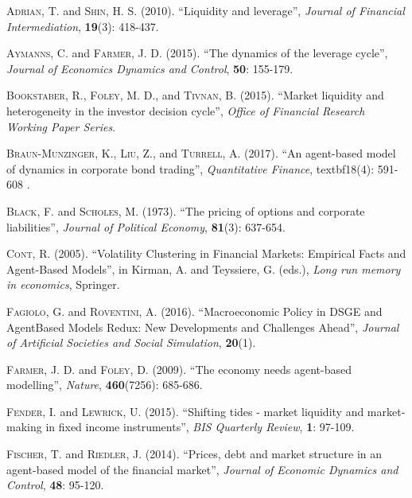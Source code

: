 \documentclass[11pt]{article}
\begin{document}
\begin{thebibliography}{100}{}
	 \textsc{Adrian, T.} and \textsc{Shin, H. S.} (2010). ``Liquidity and leverage'', \emph{Journal of Financial Intermediation}, \textbf{19}(3): 418-437.

	 \textsc{Aymanns, C.} and \textsc{Farmer, J. D.} (2015). ``The dynamics of the leverage cycle'', \emph{Journal of Economics Dynamics and Control}, \textbf{50}: 155-179.
	
	 \textsc{Bookstaber, R.}, \textsc{Foley, M. D.}, and \textsc{Tivnan, B.} (2015). ``Market liquidity and heterogeneity in the investor decision cycle'', \emph{Office of Financial Research Working Paper Series}. 
	
	 \textsc{Braun-Munzinger, K.}, \textsc{Liu, Z.}, and \textsc{Turrell, A.} (2017). ``An agent-based model of dynamics in corporate bond trading'', \emph{Quantitative Finance}, textbf{18}(4): 591-608 .

	 \textsc{Black, F.} and \textsc{Scholes, M.} (1973). ``The pricing of options and corporate liabilities'', \emph{Journal of Political Economy}, \textbf{81}(3): 637-654.

	 \textsc{Cont, R.} (2005). ``Volatility Clustering in Financial Markets: Empirical Facts and Agent-Based Models'', in Kirman, A. and Teyssiere, G. (eds.), \emph{Long run memory in economics}, Springer.

	 \textsc{Fagiolo, G.} and \textsc{Roventini, A.} (2016). ``Macroeconomic Policy in DSGE and AgentBased Models Redux: New Developments and Challenges Ahead'', \emph{Journal of Artificial Societies and Social Simulation}, \textbf{20}(1).

	 \textsc{Farmer, J. D.} and \textsc{Foley, D.} (2009). ``The economy needs agent-based modelling'', \emph{Nature}, \textbf{460}(7256): 685-686.
	
	 \textsc{Fender, I.} and \textsc{Lewrick, U.} (2015). ``Shifting tides - market liquidity and market-making in fixed income instruments'', \emph{BIS Quarterly Review}, \textbf{1}: 97-109.

	 \textsc{Fischer, T.} and \textsc{Riedler, J.} (2014). ``Prices, debt and market structure in an agent-based model of the financial market'', \emph{Journal of Economic Dynamics and Control}, \textbf{48}: 95-120.
	

\end{thebibliography}
\end{document}
